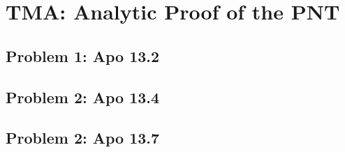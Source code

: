 \section{TMA: Analytic Proof of the PNT}

\subsection[Problem 1]{Problem 1: Apo 13.2}

\subsection[Problem 2]{Problem 2: Apo 13.4}

\subsection[Problem 2]{Problem 2: Apo 13.7}
